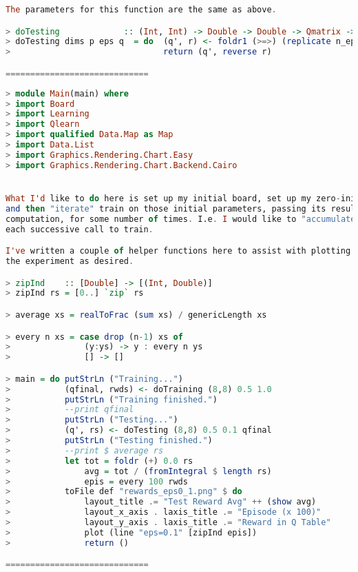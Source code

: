 \documentclass[12pt,a4paper]{article}
\begin{document}
\begin{lstlisting}[language=Haskell,numbers=none,basicstyle=\tiny]
The parameters for this function are the same as above.

> doTesting             :: (Int, Int) -> Double -> Double -> Qmatrix -> IO (Qmatrix, [Double])
> doTesting dims p eps q  = do  (q', r) <- foldr1 (>=>) (replicate n_episodes (testEpisode dims p n_steps eps)) (q, [0.0])
>                               return (q', reverse r)

=============================
	\end{lstlisting}

	\begin{lstlisting}[language=Haskell,numbers=none,basicstyle=\tiny]
> module Main(main) where
> import Board
> import Learning
> import Qlearn
> import qualified Data.Map as Map
> import Data.List
> import Graphics.Rendering.Chart.Easy
> import Graphics.Rendering.Chart.Backend.Cairo


What I'd like to do here is set up my initial board, set up my zero-initialized Qmatrix, 
and then "iterate" train on those initial parameters, passing its results into the next
computation, for some number of times. I.e. I would like to "accumulate" the results of
each successive call to train.

I've written a couple of helper functions here to assist with plotting the results of 
the experiment as desired.

> zipInd    :: [Double] -> [(Int, Double)]
> zipInd rs = [0..] `zip` rs

> average xs = realToFrac (sum xs) / genericLength xs

> every n xs = case drop (n-1) xs of
>               (y:ys) -> y : every n ys
>               [] -> []

> main = do putStrLn ("Training...")
>           (qfinal, rwds) <- doTraining (8,8) 0.5 1.0
>           putStrLn ("Training finished.")
>           --print qfinal
>           putStrLn ("Testing...")
>           (q', rs) <- doTesting (8,8) 0.5 0.1 qfinal
>           putStrLn ("Testing finished.")
>           --print $ average rs
>           let tot = foldr (+) 0.0 rs
>               avg = tot / (fromIntegral $ length rs)
>               epis = every 100 rwds
>           toFile def "rewards_eps0_1.png" $ do
>               layout_title .= "Test Reward Avg" ++ (show avg)
>               layout_x_axis . laxis_title .= "Episode (x 100)"
>               layout_y_axis . laxis_title .= "Reward in Q Table"
>               plot (line "eps=0.1" [zipInd epis])
>               return ()

=============================
	\end{lstlisting}

	
            
            
\end{document}
